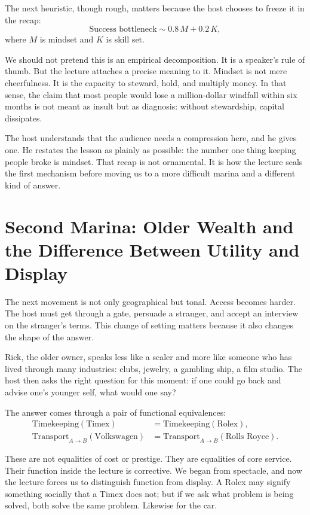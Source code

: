 The next heuristic, though rough, matters because the host chooses to freeze it in the recap:
\begin{equation}
\text{Success bottleneck} \sim 0.8\,M + 0.2\,K,
\end{equation}
where \(M\) is mindset and \(K\) is skill set.

We should not pretend this is an empirical decomposition. It is a speaker's rule of thumb. But the lecture attaches a precise meaning to it. Mindset is not mere cheerfulness. It is the capacity to steward, hold, and multiply money. In that sense, the claim that most people would lose a million-dollar windfall within six months is not meant as insult but as diagnosis: without stewardship, capital dissipates.

The host understands that the audience needs a compression here, and he gives one. He restates the lesson as plainly as possible: the number one thing keeping people broke is mindset. That recap is not ornamental. It is how the lecture seals the first mechanism before moving us to a more difficult marina and a different kind of answer.

\section{Second Marina: Older Wealth and the Difference Between Utility and Display}

The next movement is not only geographical but tonal. Access becomes harder. The host must get through a gate, persuade a stranger, and accept an interview on the stranger's terms. This change of setting matters because it also changes the shape of the answer.

Rick, the older owner, speaks less like a scaler and more like someone who has lived through many industries: clubs, jewelry, a gambling ship, a film studio. The host then asks the right question for this moment: if one could go back and advise one's younger self, what would one say?

The answer comes through a pair of functional equivalences:
\begin{align}
\text{Timekeeping}(\text{Timex}) &= \text{Timekeeping}(\text{Rolex}),\\
\text{Transport}_{A\to B}(\text{Volkswagen}) &= \text{Transport}_{A\to B}(\text{Rolls Royce}).
\end{align}

These are not equalities of cost or prestige. They are equalities of core service. Their function inside the lecture is corrective. We began from spectacle, and now the lecture forces us to distinguish function from display. A Rolex may signify something socially that a Timex does not; but if we ask what problem is being solved, both solve the same problem. Likewise for the car.

